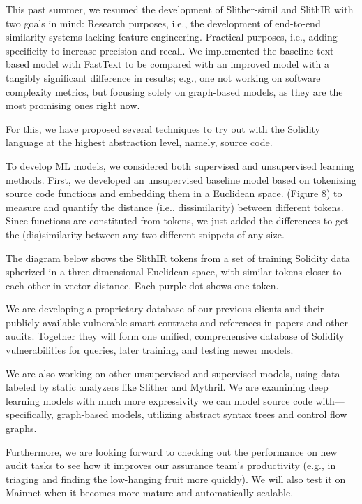 This past summer, we resumed the development of Slither-simil and SlithIR with two goals in mind:
Research purposes, i.e., the development of end-to-end similarity systems lacking feature engineering.
Practical purposes, i.e., adding specificity to increase precision and recall.
We implemented the baseline text-based model with FastText to be compared with an improved model with a tangibly significant difference in results;
e.g., one not working on software complexity metrics, but focusing solely on graph-based models, as they are the most promising ones right now.

For this, we have proposed several techniques to try out with the Solidity language at the highest abstraction level, namely, source code.

To develop ML models, we considered both supervised and unsupervised learning methods.
First, we developed an unsupervised baseline model based on tokenizing source code functions and embedding them in a Euclidean space.
(Figure 8) to measure and quantify the distance (i.e., dissimilarity) between different tokens.
Since functions are constituted from tokens, we just added the differences to get the (dis)similarity between any two different snippets of any size.

The diagram below shows the SlithIR tokens from a set of training Solidity data spherized in a three-dimensional Euclidean space, with similar tokens closer to each other in vector distance.
Each purple dot shows one token.

We are developing a proprietary database of our previous clients and their publicly available vulnerable smart contracts and references in papers and other audits.
Together they will form one unified, comprehensive database of Solidity vulnerabilities for queries, later training, and testing newer models.

We are also working on other unsupervised and supervised models, using data labeled by static analyzers like Slither and Mythril.
We are examining deep learning models with much more expressivity we can model source code with—specifically, graph-based models, utilizing abstract syntax trees and control flow graphs.

Furthermore, we are looking forward to checking out the performance \slithersimil on new audit tasks to see how
it improves our assurance team's productivity (e.g., in triaging and finding the low-hanging fruit more quickly).
We will also test it on Mainnet when it becomes more mature and automatically scalable.

